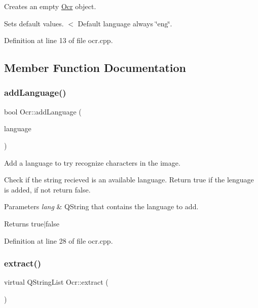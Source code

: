 Creates an empty \mbox{\hyperlink{classOcr}{Ocr}} object. 

Sets default values. $<$ Default language always \char`\"{}eng\char`\"{}. 

Definition at line 13 of file ocr.\+cpp.



\subsection{Member Function Documentation}
\mbox{\label{classOcr_ad2fb764c1c6766233ebbb53e62064bb8}} 
\subsubsection{\texorpdfstring{add\+Language()}{addLanguage()}}
{\footnotesize\ttfamily bool Ocr\+::add\+Language (\begin{DoxyParamCaption}\item[{const Q\+String \&}]{language }\end{DoxyParamCaption})\hspace{0.3cm}{\ttfamily [virtual]}}



Add a language to try recognize characters in the image. 

Check if the string recieved is an available language. Return true if the lenguage is added, if not return false.


\begin{DoxyParams}{Parameters}
{\em lang} & Q\+String that contains the language to add. \\
\hline
\end{DoxyParams}
\begin{DoxyReturn}{Returns}
true$\vert$false 
\end{DoxyReturn}


Definition at line 28 of file ocr.\+cpp.

\mbox{\label{classOcr_a09a27b3a1f579c41ebda05f2a2cf4fed}} 
\subsubsection{\texorpdfstring{extract()}{extract()}}
{\footnotesize\ttfamily virtual Q\+String\+List Ocr\+::extract (\begin{DoxyParamCaption}{ }\end{DoxyParamCaption})\hspace{0.3cm}{\ttfamily [pure virtual]}}



